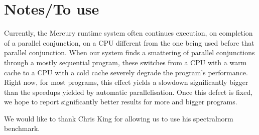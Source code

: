 \section{Notes/To use}


Currently, the Mercury runtime system
often continues execution, on completion of a parallel conjunction,
on a CPU different from the one being used before that parallel conjunction.
When our system finds a smattering of parallel conjunctions
through a mostly sequential program,
these switches from a CPU with a warm cache to a CPU with a cold cache
severely degrade the program's performance.
Right now, for most programs,
this effect yields a slowdown significantly bigger
than the speedups yielded by automatic parallelisation.
Once this defect is fixed, we hope to report significantly better results
for more and bigger programs.



We would like to thank
Chris King for allowing us to use his spectralnorm benchmark.



